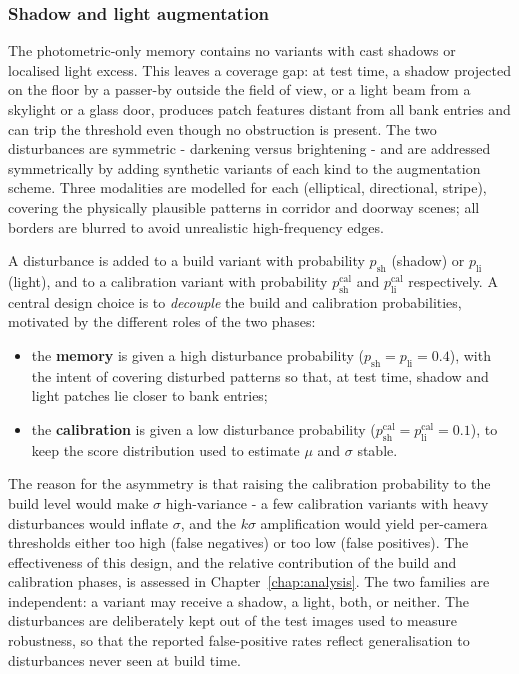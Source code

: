 \subsubsection{Shadow and light augmentation}

The photometric-only memory contains no variants with cast shadows or localised
light excess. This leaves a coverage gap: at test time, a shadow projected on the
floor by a passer-by outside the field of view, or a light beam from a skylight
or a glass door, produces patch features distant from all bank entries and can
trip the threshold even though no obstruction is present. The two disturbances are
symmetric - darkening versus brightening - and are addressed symmetrically by
adding synthetic variants of each kind to the augmentation scheme. Three
modalities are modelled for each (elliptical, directional, stripe), covering the
physically plausible patterns in corridor and doorway scenes; all borders are
blurred to avoid unrealistic high-frequency edges.

A disturbance is added to a build variant with probability $p_{\mathrm{sh}}$
(shadow) or $p_{\mathrm{li}}$ (light), and to a calibration variant with
probability $p_{\mathrm{sh}}^{\mathrm{cal}}$ and $p_{\mathrm{li}}^{\mathrm{cal}}$
respectively. A central design choice is to \emph{decouple} the build and
calibration probabilities, motivated by the different roles of the two phases:

\begin{itemize}
  \item the \textbf{memory} is given a high disturbance probability
  ($p_{\mathrm{sh}} = p_{\mathrm{li}} = 0.4$), with the intent of covering
  disturbed patterns so that, at test time, shadow and light patches lie closer to
  bank entries;
  \item the \textbf{calibration} is given a low disturbance probability
  ($p_{\mathrm{sh}}^{\mathrm{cal}} = p_{\mathrm{li}}^{\mathrm{cal}} = 0.1$), to keep
  the score distribution used to estimate $\mu$ and $\sigma$ stable.
\end{itemize}

The reason for the asymmetry is that raising the calibration probability to the
build level would make $\sigma$ high-variance - a few calibration variants with
heavy disturbances would inflate $\sigma$, and the $k\sigma$ amplification would
yield per-camera thresholds either too high (false negatives) or too low (false
positives). The effectiveness of this design, and the relative contribution of the
build and calibration phases, is assessed in Chapter~\ref{chap:analysis}. The two
families are independent: a variant may receive a shadow, a light, both, or
neither. The disturbances are deliberately kept out
of the test images used to measure robustness, so that the reported
false-positive rates reflect generalisation to disturbances never seen at build
time.

